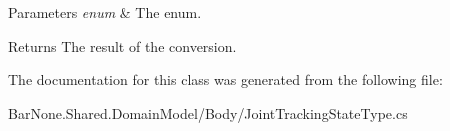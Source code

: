 \begin{DoxyParams}{Parameters}
{\em enum} & The enum.\\
\hline
\end{DoxyParams}
\begin{DoxyReturn}{Returns}
The result of the conversion. 
\end{DoxyReturn}


The documentation for this class was generated from the following file\+:\begin{DoxyCompactItemize}
\item 
Bar\+None.\+Shared.\+Domain\+Model/\+Body/Joint\+Tracking\+State\+Type.\+cs\end{DoxyCompactItemize}
